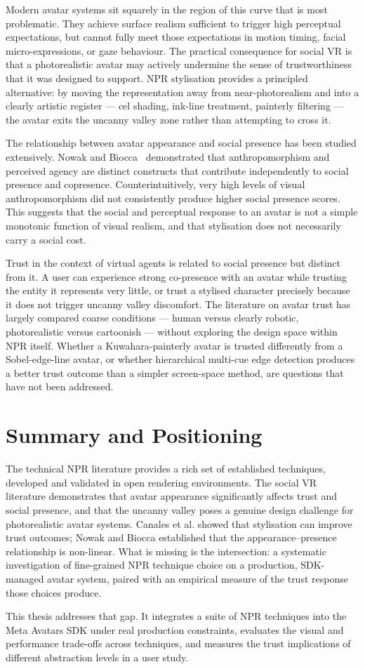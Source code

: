 Modern avatar systems sit squarely in the region of this curve that is most problematic. They achieve surface realism sufficient to trigger high perceptual expectations, but cannot fully meet those expectations in motion timing, facial micro-expressions, or gaze behaviour. The practical consequence for social VR is that a photorealistic avatar may actively undermine the sense of trustworthiness that it was designed to support. NPR stylisation provides a principled alternative: by moving the representation away from near-photorealism and into a clearly artistic register — cel shading, ink-line treatment, painterly filtering — the avatar exits the uncanny valley zone rather than attempting to cross it.

The relationship between avatar appearance and social presence has been studied extensively. Nowak and Biocca~\cite{nowak2003} demonstrated that anthropomorphism and perceived agency are distinct constructs that contribute independently to social presence and copresence. Counterintuitively, very high levels of visual anthropomorphism did not consistently produce higher social presence scores. This suggests that the social and perceptual response to an avatar is not a simple monotonic function of visual realism, and that stylisation does not necessarily carry a social cost.

Trust in the context of virtual agents is related to social presence but distinct from it. A user can experience strong co-presence with an avatar while trusting the entity it represents very little, or trust a stylised character precisely because it does not trigger uncanny valley discomfort. The literature on avatar trust has largely compared coarse conditions — human versus clearly robotic, photorealistic versus cartoonish — without exploring the design space within NPR itself. Whether a Kuwahara-painterly avatar is trusted differently from a Sobel-edge-line avatar, or whether hierarchical multi-cue edge detection produces a better trust outcome than a simpler screen-space method, are questions that have not been addressed.

\section{Summary and Positioning}
\label{sec:related_positioning}

The technical NPR literature provides a rich set of established techniques, developed and validated in open rendering environments. The social VR literature demonstrates that avatar appearance significantly affects trust and social presence, and that the uncanny valley poses a genuine design challenge for photorealistic avatar systems. Canales et al. showed that stylisation can improve trust outcomes; Nowak and Biocca established that the appearance–presence relationship is non-linear. What is missing is the intersection: a systematic investigation of fine-grained NPR technique choice on a production, SDK-managed avatar system, paired with an empirical measure of the trust response those choices produce.

This thesis addresses that gap. It integrates a suite of NPR techniques into the Meta Avatars SDK under real production constraints, evaluates the visual and performance trade-offs across techniques, and measures the trust implications of different abstraction levels in a user study.
